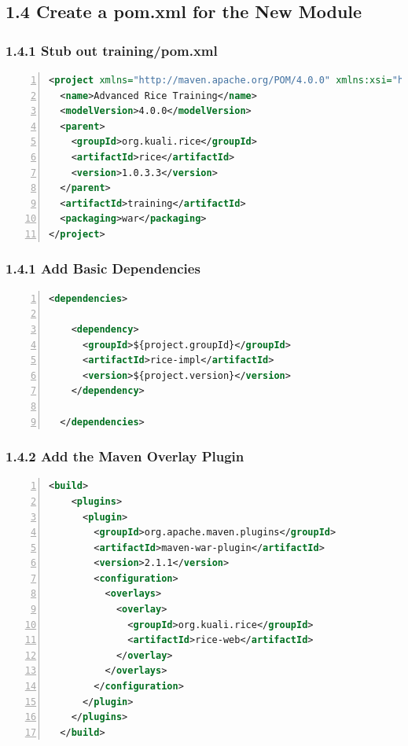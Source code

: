 \subsection*{1.4 Create a pom.xml for the New Module}
\subsubsection*{1.4.1 Stub out training/pom.xml}
\begin{lstlisting}[numbers=left,language=xml,basicstyle=\scriptsize,backgroundcolor=\color{ubergray},caption={training/pom.xml},frame=single,breaklines=true]
<project xmlns="http://maven.apache.org/POM/4.0.0" xmlns:xsi="http://www.w3.org/2001/XMLSchema-instance" xsi:schemaLocation="http://maven.apache.org/POM/4.0.0 http://maven.apache.org/maven-v4_0_0.xsd">
  <name>Advanced Rice Training</name>
  <modelVersion>4.0.0</modelVersion>
  <parent>
    <groupId>org.kuali.rice</groupId>
    <artifactId>rice</artifactId>
    <version>1.0.3.3</version>
  </parent>
  <artifactId>training</artifactId>
  <packaging>war</packaging>
</project>
\end{lstlisting}

\subsubsection*{1.4.1 Add Basic Dependencies}
\begin{lstlisting}[numbers=left,language=xml,basicstyle=\scriptsize,backgroundcolor=\color{ubergray},caption={training/pom.xml},frame=single,breaklines=true]
  <dependencies>

    <dependency>
      <groupId>${project.groupId}</groupId>
      <artifactId>rice-impl</artifactId>
      <version>${project.version}</version>
    </dependency>

  </dependencies>  
\end{lstlisting}

\subsubsection*{1.4.2 Add the Maven Overlay Plugin}
\begin{lstlisting}[numbers=left,language=xml,basicstyle=\scriptsize,backgroundcolor=\color{ubergray},caption={training/pom.xml},frame=single,breaklines=true]
  <build>
    <plugins>
      <plugin>
        <groupId>org.apache.maven.plugins</groupId>
        <artifactId>maven-war-plugin</artifactId>
        <version>2.1.1</version>
        <configuration>
          <overlays>
            <overlay>
              <groupId>org.kuali.rice</groupId>
              <artifactId>rice-web</artifactId>
            </overlay>
          </overlays>
        </configuration>
      </plugin>
    </plugins>
  </build>
\end{lstlisting}

